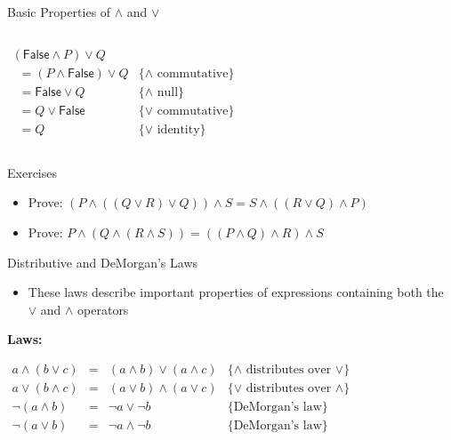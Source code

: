 \documentclass[11pt,t,pdf,xcolor=svgnames,aspectratio=169]{beamer}
\providecommand{\tightlist}{%
  \setlength{\itemsep}{5pt}\setlength{\parskip}{0pt}}
\begin{document}
\begin{frame}{Basic Properties of \(\land\) and \(\lor\)}
\begin{columns}[T]
\begin{column}{0.48\textwidth}
\(\begin{array}{lr} (\textsf{False} \land P) \lor Q & \\ \,\,\,= (P \land \textsf{False}) \lor Q & \{\land\,\, \textrm{commutative}\} \\ \,\,\,= \textsf{False} \lor Q & \{\land\,\, \textrm{null}\} \\ \,\,\,= Q \lor \textsf{False} & \{\lor\,\, \textrm{commutative}\} \\ \,\,\,= Q & \{\lor\,\, \textrm{identity}\} \end{array}\)
\end{column}
\end{columns}
\end{frame}

\begin{frame}{Exercises}
\protect\hypertarget{exercises-2}{}
\begin{itemize}
\item
  Prove:
  \(\left(P \land ((Q \lor R) \lor Q)\right) \land S = S \land ((R \lor Q) \land P)\)
\item
  Prove:
  \(P \land (Q \land (R \land S)) = ((P \land Q) \land R) \land S\)
\end{itemize}
\end{frame}

\begin{frame}{Distributive and DeMorgan's Laws}
\protect\hypertarget{distributive-and-demorgans-laws}{}
\begin{itemize}
\tightlist
\item
  These laws describe important properties of expressions containing
  both the \(\lor\) and \(\land\) operators
\end{itemize}

\textbf{Laws:}

\begin{center}
$\begin{array}{rcll}
a \land (b \lor c) & = & (a \land b) \lor (a \land c) & \{\land\,\, \textrm{distributes over}\,\, \lor\} \\
a \lor (b \land c) & = & (a \lor b) \land (a \lor c)  & \{\lor\,\, \textrm{distributes over}\,\, \land\} \\
\lnot (a \land b)  & = & \lnot a \lor \lnot b         & \{\textrm{DeMorgan's law}\} \\
\lnot (a \lor b)   & = & \lnot a \land \lnot b        & \{\textrm{DeMorgan's law}\}
\end{array}$
\end{center}
\end{frame}
\end{document}
